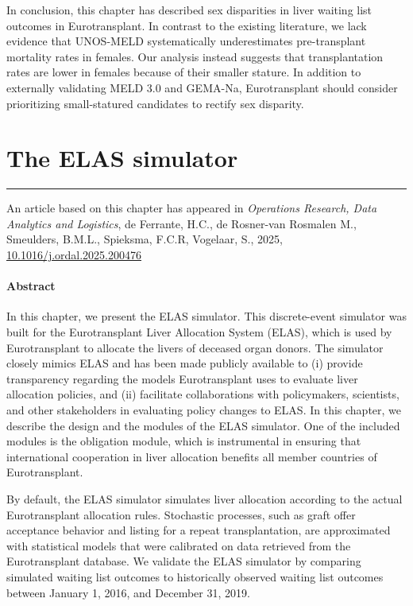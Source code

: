 \documentclass[11pt,twoside,]{book}
\begin{document}
In conclusion, this chapter has described sex disparities in liver waiting list
outcomes in Eurotransplant. In contrast to the existing literature, we lack
evidence that UNOS-MELD systematically underestimates pre-transplant
mortality rates in females. Our analysis instead suggests that transplantation
rates are lower in females because of their smaller stature. In addition to
externally validating MELD 3.0 and GEMA-Na, Eurotransplant should consider
prioritizing small-statured candidates to rectify sex disparity.

\chapter{The ELAS simulator}\label{CHelassimulator}


\vfill

\begin{center}\rule{0.5\linewidth}{0.5pt}\end{center}

\noindent
An article based on this chapter has appeared in \emph{Operations Research, Data Analytics and Logistics}, de Ferrante, H.C., de Rosner-van Rosmalen M., Smeulders, B.M.L., Spieksma, F.C.R, Vogelaar, S., 2025, \href{https://doi.org/10.1016/j.ordal.2025.200476}{10.1016/j.ordal.2025.200476} \citep{deFerranteELASSimulator2025}

\newpage
\normalsize

\subsubsection*{Abstract}
In this chapter, we present the ELAS simulator. This discrete-event simulator
was built for the Eurotransplant Liver Allocation System (ELAS), which
is used by Eurotransplant to allocate the livers of deceased organ donors.
The simulator closely mimics ELAS and has been made publicly available
to (i) provide transparency regarding the models Eurotransplant uses to
evaluate liver allocation policies, and (ii) facilitate collaborations with
policymakers, scientists, and other stakeholders in evaluating
policy changes to ELAS. In this chapter, we describe the design and the modules
of the ELAS simulator. One of the included modules is the
obligation module, which is instrumental in ensuring that
international cooperation in liver allocation benefits all member
countries of Eurotransplant.

By default, the ELAS simulator simulates liver allocation according to
the actual Eurotransplant allocation rules. Stochastic processes, such
as graft offer acceptance behavior and listing for a repeat
transplantation, are approximated with statistical models that were
calibrated on data retrieved from the Eurotransplant database. We validate
the ELAS simulator by comparing simulated waiting list outcomes to
historically observed waiting list outcomes between January 1, 2016, and
December 31, 2019.
\end{document}
